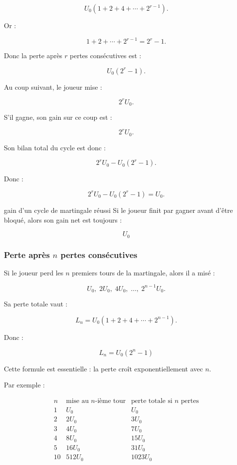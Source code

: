 \documentclass[11pt,a4paper]{article}
\begin{document}
\[
U_0(1+2+4+\cdots+2^{r-1}).
\]

Or :

\[
1+2+\cdots+2^{r-1}=2^r-1.
\]

Donc la perte après \(r\) pertes consécutives est :

\[
U_0(2^r-1).
\]

Au coup suivant, le joueur mise :

\[
2^rU_0.
\]

S'il gagne, son gain sur ce coup est :

\[
2^rU_0.
\]

Son bilan total du cycle est donc :

\[
2^rU_0-U_0(2^r-1).
\]

Donc :

\[
2^rU_0-U_0(2^r-1)=U_0.
\]

\begin{equationbox}{gain d'un cycle de martingale réussi}
Si le joueur finit par gagner avant d'être bloqué, alors son gain net est toujours :

\[
\boxed{U_0}
\]
\end{equationbox}

\subsubsection*{Perte après \(n\) pertes consécutives}

Si le joueur perd les \(n\) premiers tours de la martingale, alors il a misé :

\[
U_0,\;2U_0,\;4U_0,\;\dots,\;2^{n-1}U_0.
\]

Sa perte totale vaut :

\[
L_n=U_0(1+2+4+\cdots+2^{n-1}).
\]

Donc :

\[
\boxed{L_n=U_0(2^n-1)}
\]

Cette formule est essentielle : la perte croît exponentiellement avec \(n\).

Par exemple :

\[
\begin{array}{c|c|c}
n & \text{mise au }n\text{-ième tour} & \text{perte totale si }n\text{ pertes} \\
\hline
1 & U_0 & U_0 \\
2 & 2U_0 & 3U_0 \\
3 & 4U_0 & 7U_0 \\
4 & 8U_0 & 15U_0 \\
5 & 16U_0 & 31U_0 \\
10 & 512U_0 & 1023U_0 \\
\end{array}
\]
\end{document}
